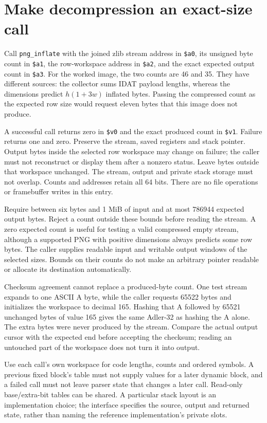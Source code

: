 \section{Make decompression an exact-size call}
Call \texttt{png\_inflate} with the joined zlib stream address in \texttt{\$a0}, its
unsigned byte count in \texttt{\$a1}, the row-workspace address in \texttt{\$a2}, and
the exact expected output count in \texttt{\$a3}. For the worked image, the two counts
are 46 and 35. They have different sources: the collector sums IDAT payload lengths,
whereas the dimensions predict $h(1+3w)$ inflated bytes. Passing the compressed count
as the expected row size would request eleven bytes that this image does not produce.

A successful call returns zero in \texttt{\$v0} and the exact produced count in
\texttt{\$v1}. Failure returns one and zero. Preserve the stream, saved registers and
stack pointer. Output bytes inside the selected row workspace may change on failure;
the caller must not reconstruct or display them after a nonzero status. Leave bytes
outside that workspace unchanged. The stream, output and private stack storage must
not overlap. Counts and addresses retain all 64 bits. There are no file operations
or framebuffer writes in this entry.

Require between six bytes and 1 MiB of input and at most 786944 expected output bytes.
Reject a count outside these bounds before reading the stream. A zero expected count
is useful for testing a valid compressed empty stream, although a supported PNG with
positive dimensions always predicts some row bytes. The caller supplies readable input
and writable output windows of the selected sizes. Bounds on their counts do not make
an arbitrary pointer readable or allocate its destination automatically.

Checksum agreement cannot replace a produced-byte count. One test stream expands to
one ASCII A byte, while the caller requests 65522 bytes and initializes the workspace
to decimal 165. Hashing that A followed by 65521 unchanged bytes of value 165 gives the
same Adler-32 as hashing the A alone. The extra bytes were never produced by the
stream. Compare the actual output cursor with the expected end before accepting the
checksum; reading an untouched part of the workspace does not turn it into output.

Use each call's own workspace for code lengths, counts and ordered symbols. A previous
fixed block's table must not supply values for a later dynamic block, and a failed call
must not leave parser state that changes a later call. Read-only base/extra-bit tables
can be shared. A particular stack layout is an implementation choice; the interface
specifies the source, output and returned state, rather than naming the reference
implementation's private slots.
